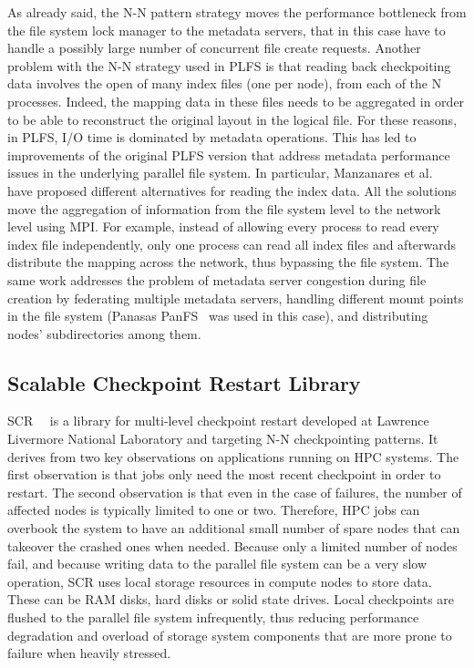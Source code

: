As already said, the N-N pattern strategy moves the performance bottleneck from the file system lock manager to the metadata servers, that in this case have to handle a possibly large number of concurrent file
create requests. Another problem with the N-N strategy used in PLFS is that reading back checkpoiting data involves the open of many index files (one per node), from each of the N processes. Indeed, the mapping 
data in these files needs to be aggregated in order to be able to reconstruct the original layout in the logical file. For these reasons, in PLFS, I/O time is dominated by metadata operations. This has led 
to improvements of the original PLFS version that address metadata performance issues in the underlying parallel file system. In particular, Manzanares et al.~\cite{Adam2011} have proposed different alternatives 
for reading the index data. All the solutions move the aggregation of information from the file system level to the network level using MPI. For example, instead of allowing every process to read every index file
independently, only one process can read all index files and afterwards distribute the mapping across the network, thus bypassing the file system. The same work addresses the problem of metadata server congestion 
during file creation by federating multiple metadata servers, handling different mount points in the file system (Panasas PanFS~\cite{Welch2004} was used in this case), and distributing nodes' subdirectories among 
them.

\subsection{Scalable Checkpoint Restart Library}
SCR~\cite{Moody2010_2}~\cite{Moody2010} is a library for multi-level checkpoint restart developed at Lawrence Livermore National Laboratory and targeting N-N checkpointing patterns. It derives from two key 
observations on applications running on HPC systems. The first observation is that jobs only need the most recent checkpoint in order to restart. The second observation is that even in the case of failures, 
the number of affected nodes is typically limited to one or two. Therefore, HPC jobs can overbook the system to have an additional small number of spare nodes that can takeover the crashed ones when needed.
Because only a limited number of nodes fail, and because writing data to the parallel file system can be a very slow operation, SCR uses local storage resources in compute nodes to store data. These can be RAM 
disks, hard disks or solid state drives. Local checkpoints are flushed to the parallel file system infrequently, thus reducing performance degradation and overload of storage system components that are more 
prone to failure when heavily stressed.


